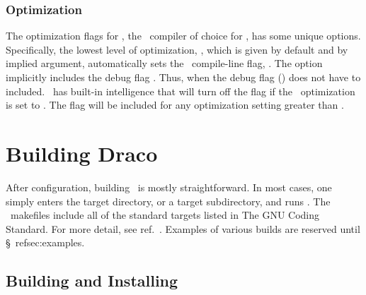 \subsubsection{Optimization}
\label{sec:optimization}

The optimization flags for \KCC, the \cpp\ compiler of choice for
\draco, has some unique options.  Specifically, the lowest level of
optimization, , which is given by default and by
implied argument, automatically sets the \KCC\ compile-line flag,
.  The  option implicitly includes the debug flag
.  Thus, when  the debug flag
() does not have to included.  \draco\ has
built-in intelligence that will turn off the  flag if the
\KCC\ optimization is set to .  The  flag will be
included for any optimization setting greater than .


\section{Building Draco}
\label{sec:building_draco}

After configuration, building \draco\ is mostly straightforward.  In
most cases, one simply enters the target directory, or a target
subdirectory, and runs \gmake.  The \draco\ makefiles include all of
the standard targets listed in The GNU Coding Standard.  For more
detail, see ref.~\cite{gnu}.  Examples of various builds are reserved
until \S~ref{sec:examples}.

\subsection{Building and Installing}


